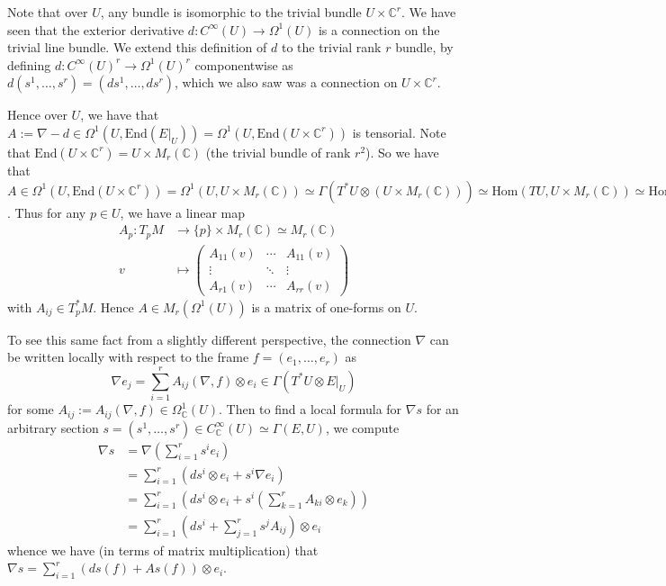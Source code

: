 \documentclass[a4paper]{article}
\theoremstyle{definition} \newtheorem*{definition}{Definition}
\theoremstyle{definition} \newtheorem*{definitions}{Definitions}
\theoremstyle{plain} \newtheorem{theorem}{Theorem}[section]
\theoremstyle{plain} \newtheorem{proposition}[theorem]{Proposition}
\theoremstyle{plain} \newtheorem{corollary}[theorem]{Corollary}
\theoremstyle{plain} \newtheorem{lemma}[theorem]{Lemma}
\theoremstyle{plain} \newtheorem{example}[theorem]{Example}
\newcommand{\complexnos}{\mathbb{C}}
\newcommand{\smoothCmaps}{C^\infty_\complexnos (U)}
\newcommand{\Hom}{\text{Hom}}
\newcommand{\End}{\text{End}}
\newcommand{\smooth}{C^\infty}
\begin{document}
Note that over $U$, any bundle is isomorphic to the trivial bundle $U\times \complexnos^r$. We have seen that the exterior derivative $d:\smooth(U)\to \Omega^1(U)$ is a connection on the trivial line bundle. We extend this definition of $d$ to the trivial rank $r$ bundle, by defining $d: \smooth(U)^r\to \Omega^1(U)^r$ componentwise as $d(s^1, \ldots, s^r) = (ds^1, \ldots, ds^r)$, which we also saw was a connection on $U\times \complexnos^r$. 

Hence over $U$, we have that $A:=\nabla-d\in \Omega^1(U, \End(E|_U)) = \Omega^1(U, \End(U\times \complexnos^r))$ is tensorial. Note that $\End(U\times \complexnos^r)=U\times M_r(\complexnos)$ (the trivial bundle of rank $r^2$). So we have that $A\in \Omega^1(U, \End(U\times \complexnos^r)) = \Omega^1(U, U\times M_r(\complexnos)) \simeq \Gamma(T^*U\otimes (U\times M_r(\complexnos))) \simeq \Hom(TU, U\times M_r(\complexnos)) \simeq \Hom_{\smooth(M)}(\mathfrak{X}(U), M_r(\smoothCmaps))$. Thus for any $p\in U$, we have a linear map
\begin{align*}
A_p : T_pM & \to \{p\}\times M_r(\complexnos) \simeq M_r(\complexnos) \\
v & \mapsto \begin{pmatrix}
A_{11}(v) & \cdots & A_{11}(v)\\
\vdots & \ddots & \vdots \\
A_{r1}(v) & \cdots & A_{rr}(v)
\end{pmatrix}
\end{align*}
with $A_{ij}\in T_p^*M$. Hence $A\in M_r(\Omega^1(U))$ is a matrix of one-forms on $U$. 

To see this same fact from a slightly different perspective, the connection $\nabla$ can be written locally with respect to the frame $f=(e_1, \ldots, e_r)$ as 
$$\nabla e_j = \sum_{i=1}^r A_{ij}(\nabla, f)\otimes e_i \in \Gamma(T^*U\otimes E|_U)$$
for some $A_{ij}:=A_{ij}(\nabla, f) \in \Omega_\complexnos^1(U)$. Then to find a local formula for $\nabla s$ for an arbitrary section $s=(s^1, \ldots,  s^r)\in \smoothCmaps\simeq \Gamma(E, U)$, we compute
\begin{align*}
\nabla s & = \nabla (\sum_{i=1}^r s^i e_i) \\
& = \sum_{i=1}^r (d s^i \otimes e_i + s^i \nabla e_i) \\
& = \sum_{i=1}^r (d s^i \otimes e_i + s^i (\sum_{k=1}^r A_{ki}\otimes e_k )) \\
& = \sum_{i=1}^r (d s^i + \sum_{j=1}^r s^j A_{ij})\otimes e_i 
\end{align*}
whence we have (in terms of matrix multiplication) that 
$\nabla s = \sum_{i=1}^r (d s(f) + As(f))\otimes e_i$.
\end{document}
